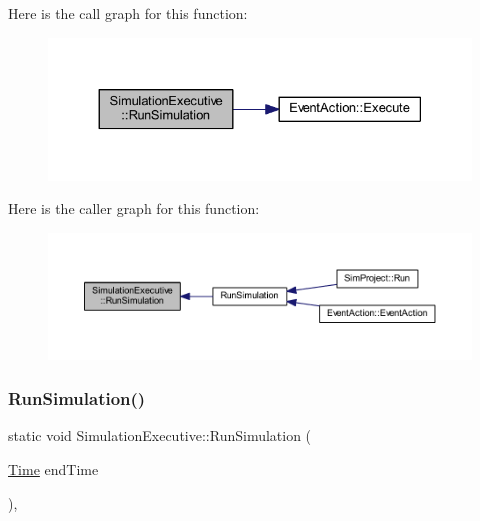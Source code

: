 Here is the call graph for this function\+:
\nopagebreak
\begin{figure}[H]
\begin{center}
\leavevmode
\includegraphics[width=330pt]{class_simulation_executive_aefcd760dfa5abac47f90871218f5a142_cgraph}
\end{center}
\end{figure}
Here is the caller graph for this function\+:
\nopagebreak
\begin{figure}[H]
\begin{center}
\leavevmode
\includegraphics[width=350pt]{class_simulation_executive_aefcd760dfa5abac47f90871218f5a142_icgraph}
\end{center}
\end{figure}
\mbox{\label{class_simulation_executive_aeb51e8a0457a294919d1b02068606e14}} 
\subsubsection{\texorpdfstring{Run\+Simulation()}{RunSimulation()}\hspace{0.1cm}{\footnotesize\ttfamily [2/2]}}
{\footnotesize\ttfamily static void Simulation\+Executive\+::\+Run\+Simulation (\begin{DoxyParamCaption}\item[{\hyperlink{_simulation_executive_8h_ac2d3e0ba793497bcca555c7c2cf64ff3}{Time}}]{end\+Time }\end{DoxyParamCaption})\hspace{0.3cm}{\ttfamily [inline]}, {\ttfamily [static]}}



